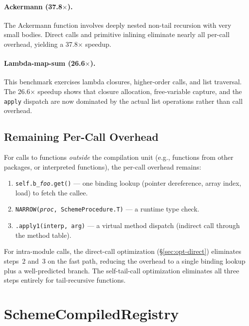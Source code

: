 \documentclass[12pt]{report}
\begin{document}
\paragraph{Ackermann (37.8$\times$).}
The Ackermann function involves
deeply nested non-tail recursion with very small bodies.
Direct calls and primitive inlining eliminate nearly all per-call
overhead, yielding a 37.8$\times$ speedup.

\paragraph{Lambda-map-sum (26.6$\times$).}
This benchmark exercises lambda closures, higher-order calls, and
list traversal.  The 26.6$\times$ speedup shows that closure
allocation, free-variable capture, and the \texttt{apply} dispatch
are now dominated by the actual list operations rather than
call overhead.

\subsection{Remaining Per-Call Overhead}
\label{sec:impl-bottleneck}

For calls to functions \emph{outside} the compilation unit (e.g.,
functions from other packages, or interpreted functions), the
per-call overhead remains:

\begin{enumerate}
\item \texttt{self.b\_\emph{foo}.get()} --- one binding lookup
  (pointer dereference, array index, load) to fetch the callee.
\item \texttt{NARROW(\emph{proc}, SchemeProcedure.T)} --- a runtime
  type check.
\item \texttt{.apply1(interp, arg)} --- a virtual method dispatch
  (indirect call through the method table).
\end{enumerate}

\noindent
For intra-module calls, the direct-call optimization
(\S\ref{sec:opt-direct}) eliminates steps~2 and~3 on the fast
path, reducing the overhead to a single binding lookup plus a
well-predicted branch.  The self-tail-call optimization eliminates
all three steps entirely for tail-recursive functions.

\section{SchemeCompiledRegistry}
\label{sec:impl-registry}
\end{document}
